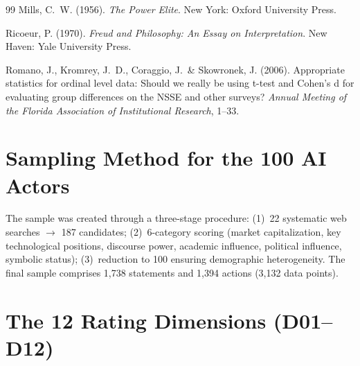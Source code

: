 \documentclass[12pt,a4paper]{article}
\begin{document}
\begin{thebibliography}{99}
  Mills, C.~W. (1956).
  \textit{The Power Elite}.
  New York: Oxford University Press.

  Ricoeur, P. (1970).
  \textit{Freud and Philosophy: An Essay on Interpretation}.
  New Haven: Yale University Press.

  Romano, J., Kromrey, J.~D., Coraggio, J.~\& Skowronek, J. (2006).
  Appropriate statistics for ordinal level data: Should we really be using t-test and Cohen's d for evaluating group differences on the NSSE and other surveys?
  \textit{Annual Meeting of the Florida Association of Institutional Research}, 1--33.

\end{thebibliography}



\newpage
\appendix

\section{Sampling Method for the 100 AI Actors}
\label{app:sampling}

The sample was created through a three-stage procedure: (1)~22 systematic web searches $\to$ 187 candidates; (2)~6-category scoring (market capitalization, key technological positions, discourse power, academic influence, political influence, symbolic status); (3)~reduction to 100 ensuring demographic heterogeneity. The final sample comprises 1,738 statements and 1,394 actions (3,132 data points).


\section{The 12 Rating Dimensions (D01--D12)}
\label{app:dimensionen}
\end{document}
